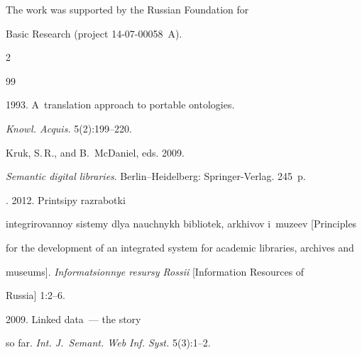 The work was supported by the Russian Foundation for

Basic Research (project 14-07-00058~A).










  \begin{multicols}{2}



\renewcommand{\bibname}{\protect\rmfamily References}




{\small\frenchspacing

 {%


 \begin{thebibliography}{99}


 1993. A~translation approach to portable ontologies. 

\textit{Knowl. Acquis.} 5(2):199--220. 


Kruk, S.\,R., and B.~McDaniel, eds. 2009.

\textit{Semantic digital libraries}. Berlin--Heidelberg: Springer-Verlag. 245~p.


. 2012. Printsipy razrabotki 

integrirovannoy sistemy dlya nauchnykh bibliotek, arkhivov i~muzeev [Principles 

for the development of an integrated system for academic libraries, archives and 

museums]. \textit{Informatsionnye resursy Rossii} [Information Resources of 

Russia] 1:2--6. 


 2009. Linked data~--- the story 

so far. \textit{Int. J.~Semant. Web Inf. Syst.} 5(3):1--2.


\end{thebibliography}}}
\end{multicols}
